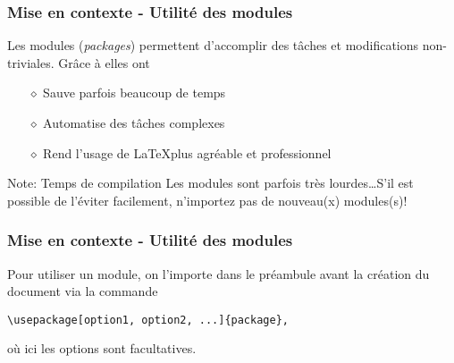 
\begin{frame}
    \frametitle{Mise en contexte - Utilité des modules}
    Les modules (\textit{packages}) permettent d'accomplir
    des tâches et modifications non-triviales. Grâce à elles ont
    \vspace{0.3cm}
    \begin{itemize}
        \pause
        \item[$\diamond$] Sauve parfois beaucoup de temps
        \item[$\diamond$] Automatise des tâches complexes
        \item[$\diamond$] Rend l'usage de \LaTeX\;plus agréable et professionnel
    \end{itemize}
    \vfill
    \pause
    \begin{noteblock}{Note: Temps de compilation}
        Les modules sont parfois très lourdes\dots\;S'il est possible de l'éviter
        facilement, n'importez pas de nouveau(x) modules(s)!
    \end{noteblock}
\end{frame}

\begin{frame}[fragile]
    \frametitle{Mise en contexte - Utilité des modules}
    Pour utiliser un module, on l'importe dans le préambule \textcolor{hard_green}{avant la création du
    document} via la commande
    \vfill
    \begin{lstlisting}[xleftmargin=-10mm]
        \usepackage[option1, option2, ...]{package},
    \end{lstlisting}
    \vfill
    où ici les options sont facultatives.
\end{frame}

